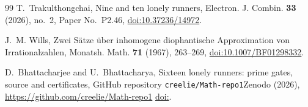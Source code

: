 \documentclass[aps,prd,twocolumn,superscriptaddress,nofootinbib,longbibliography,floatfix,showkeys,amsmath,amssymb,10pt]{revtex4-2}
\theoremstyle{definition}
\theoremstyle{remark}
\def\zenodoID{}%
\newcommand{\archivelink}{\ifx\zenodoID\empty\url{https://github.com/creelie/Math-repo1}%
 \else\href{https://doi.org/\zenodoID}{doi:\zenodoID}\fi}
\begin{document}
\begin{thebibliography}{99}
T.~Trakulthongchai, Nine and ten lonely runners, Electron. J. Combin.
\textbf{33} (2026), no.~2, Paper No.~P2.46,
\href{https://doi.org/10.37236/14972}{doi:10.37236/14972}.

J.~M. Wills, Zwei S\"atze \"uber inhomogene diophantische Approximation von
Irrationalzahlen, Monatsh. Math. \textbf{71} (1967), 263--269,
\href{https://doi.org/10.1007/BF01298332}{doi:10.1007/BF01298332}.

D.~Bhattacharjee and U.~Bhattacharya, Sixteen lonely runners: prime gates,
source and certificates, \ifx\zenodoID\empty GitHub repository
\texttt{creelie/Math-repo1}\else Zenodo\fi{} (2026), \archivelink.

\end{thebibliography}
\end{document}
